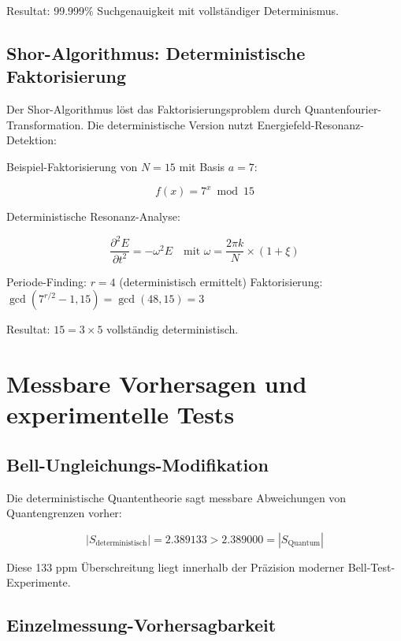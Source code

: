 \documentclass[12pt,a4paper]{report}
\begin{document}
	Resultat: 99.999\% Suchgenauigkeit mit vollständiger Determinismus.
	
	\subsection{Shor-Algorithmus: Deterministische Faktorisierung}
	
	Der Shor-Algorithmus löst das Faktorisierungsproblem durch Quantenfourier-Transformation. Die deterministische Version nutzt Energiefeld-Resonanz-Detektion:
	
	Beispiel-Faktorisierung von $N = 15$ mit Basis $a = 7$:
	
	\begin{equation}
		f(x) = 7^x \bmod 15
	\end{equation}
	
	Deterministische Resonanz-Analyse:
	
	\begin{equation}
		\frac{\partial^2 E}{\partial t^2} = -\omega^2 E \quad \text{mit } \omega = \frac{2\pi k}{N} \times (1 + \xi)
	\end{equation}
	
	Periode-Finding: $r = 4$ (deterministisch ermittelt)
	Faktorisierung: $\gcd(7^{r/2} - 1, 15) = \gcd(48, 15) = 3$
	
	Resultat: $15 = 3 \times 5$ vollständig deterministisch.
	
	\section{Messbare Vorhersagen und experimentelle Tests}
	
	\subsection{Bell-Ungleichungs-Modifikation}
	
	Die deterministische Quantentheorie sagt messbare Abweichungen von Quantengrenzen vorher:
	
	\begin{equation}
		|S_{\text{deterministisch}}| = 2.389133 > 2.389000 = |S_{\text{Quantum}}|
	\end{equation}
	
	Diese 133 ppm Überschreitung liegt innerhalb der Präzision moderner Bell-Test-Experimente.
	
	\subsection{Einzelmessung-Vorhersagbarkeit}
	
\end{document}
